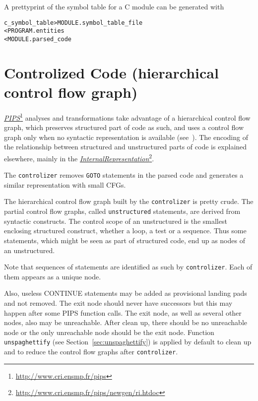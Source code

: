 \documentclass[a4paper]{report}
\newenvironment{PipsMake}{\begin{alltt}}{\end{alltt}}
\newcommand{\LINK}[2]{\href{#2}{#1}\footnote{\url{#2}}\xspace}
\newcommand{\PIPS}{\LINK{\emph{PIPS}}{http://www.cri.ensmp.fr/pips}}
\newcommand{\Pri}{\LINK{\emph{Internal\space{}Representation}}{http://www.cri.ensmp.fr/pips/newgen/ri.htdoc}}
\begin{document}
A prettyprint of the symbol table for a C module can be generated with
\begin{PipsMake}
c_symbol_table      > MODULE.symbol_table_file
        < PROGRAM.entities
        < MODULE.parsed_code
\end{PipsMake}


\section{Controlized Code (hierarchical control flow graph)}
\label{subsection-controlized-code}

\PIPS{} analyses and transformations take advantage of a hierarchical
control flow graph, which preserves structured part of code as such, and
uses a control flow graph only when no syntactic representation is
available (see~\cite{IJT91}). The encoding of the relationship between
structured and unstructured parts of code is explained elsewhere, mainly
in the \Pri.

The \verb+controlizer+ removes \verb+GOTO+
statements in the parsed code and generates a similar representation
with small CFGs.

The hierarchical control flow graph built by the \texttt{controlizer} is
pretty crude. The partial control flow graphs, called
\texttt{unstructured} statements, are derived from syntactic
constructs. The control scope of an unstructured is the smallest
enclosing structured construct, whether a loop, a test or a sequence.
Thus some statements, which might be seen as part of structured code, end up
as nodes of an unstructured.

Note that sequences of statements are identified as such by
\texttt{controlizer}. Each of them appears as a unique node.

Also, useless CONTINUE statements may be added as provisional landing
pads and not removed. The exit node should never have successors but this
may happen after some PIPS function calls. The
exit node, as well as several other nodes, also may be unreachable. After
clean up, there should be no unreachable node or the only unreachable node
should be the exit node.
Function \texttt{unspaghettify} (see
Section~\ref{sec:unspaghettify}) is applied by default to clean
up and to reduce the control flow graphs after \texttt{controlizer}.
\end{document}
